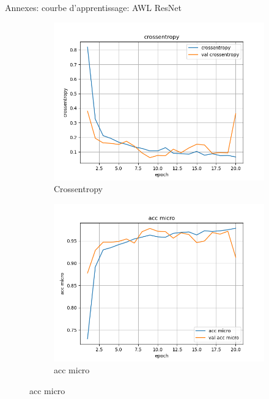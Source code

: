 \documentclass[11pt]{beamer}
\begin{document}
\begin{frame}{Annexes: courbe d'apprentissage: AWL ResNet}
    \begin{figure}[ht]
        \centering
        \begin{subfigure}{0.32\textwidth}
            \centering
            \includegraphics[width=\linewidth]{../logs/resnet_allw_img256_2/crossentropy.png}
            \caption{Crossentropy}
        \end{subfigure}
        \begin{subfigure}{0.32\textwidth}
            \centering
            \includegraphics[width=\linewidth]{../logs/resnet_allw_img256_2/acc micro.png}
            \caption{acc micro}
        \end{subfigure}

\end{figure}
\end{frame}
\end{document}
